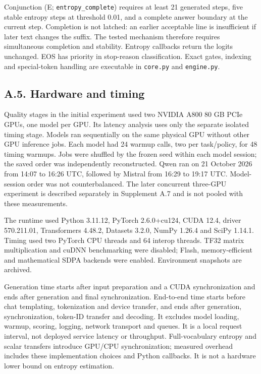 \documentclass[
  12pt,
  a4paper,
]{article}
\begin{document}
Conjunction (E; \texttt{entropy\_complete}) requires at least 21
generated steps, five stable entropy steps at threshold 0.01, and a
complete answer boundary at the current step. Completion is not latched:
an earlier acceptable line is insufficient if later text changes the
suffix. The tested mechanism therefore requires simultaneous completion
and stability. Entropy callbacks return the logits unchanged. EOS has
priority in stop-reason classification. Exact gates, indexing and
special-token handling are executable in \texttt{core.py} and
\texttt{engine.py}.

\subsection{A.5. Hardware and timing}\label{a.5.-hardware-and-timing}

Quality stages in the initial experiment used two NVIDIA A800 80 GB PCIe
GPUs, one model per GPU. Its latency analysis uses only the separate
isolated timing stage. Models ran sequentially on the same physical GPU
without other GPU inference jobs. Each model had 24 warmup calls, two
per task/policy, for 48 timing warmups. Jobs were shuffled by the frozen
seed within each model session; the saved order was independently
reconstructed. Qwen ran on 21 October 2026 from 14:07 to 16:26 UTC,
followed by Mistral from 16:29 to 19:17 UTC. Model-session order was not
counterbalanced. The later concurrent three-GPU experiment is described
separately in Supplement A.7 and is not pooled with these measurements.

The runtime used Python 3.11.12, PyTorch 2.6.0+cu124, CUDA 12.4, driver
570.211.01, Transformers 4.48.2, Datasets 3.2.0, NumPy 1.26.4 and SciPy
1.14.1. Timing used two PyTorch CPU threads and 64 interop threads. TF32
matrix multiplication and cuDNN benchmarking were disabled; Flash,
memory-efficient and mathematical SDPA backends were enabled.
Environment snapshots are archived.

Generation time starts after input preparation and a CUDA
synchronization and ends after generation and final synchronization.
End-to-end time starts before chat templating, tokenization and device
transfer, and ends after generation, synchronization, token-ID transfer
and decoding. It excludes model loading, warmup, scoring, logging,
network transport and queues. It is a local request interval, not
deployed service latency or throughput. Full-vocabulary entropy and
scalar transfers introduce GPU/CPU synchronization; measured overhead
includes these implementation choices and Python callbacks. It is not a
hardware lower bound on entropy estimation.
\end{document}
